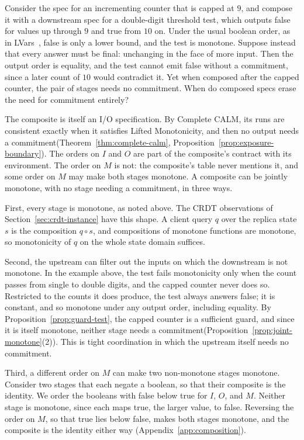 \documentclass[sigconf]{cidr-2027}
\theoremstyle{remark}
\newcommand{\commitment}{commitment\xspace}
\newcommand{\spectype}[1][]{I/O specification#1\xspace}
\begin{document}
Consider the spec for an incrementing counter that is capped at $9$, and
compose it with a downstream spec for a double-digit threshold test, which
outputs \textsf{false} for values up through $9$ and \textsf{true} from $10$ on. Under the usual boolean order, as in LVars~\cite{kuper2013lvars}, \textsf{false}
is only a lower bound, and the test is monotone. Suppose instead that every
answer must be final: unchanging in the face of more input. Then the output order is equality, and the test cannot
emit \textsf{false} without a \commitment, since a later count of $10$ would
contradict it. Yet when composed after the capped counter, the pair of
stages needs no \commitment. When do composed specs erase the need for
\commitment entirely?

The composite is itself an \spectype. By Complete CALM, its runs are
consistent exactly when it satisfies Lifted Monotonicity, and then no output needs a
\commitment (Theorem~\ref{thm:complete-calm},
Proposition~\ref{prop:exposure-boundary}). The orders on $I$ and $O$ are part
of the composite's contract with its environment. The order on $M$ is not:
the composite's table never mentions it, and some order on $M$ may make both
stages monotone. A composite can be jointly monotone, with no stage needing a
\commitment, in three ways.

First, every stage is monotone, as noted above. The CRDT observations of Section~\ref{sec:crdt-instance} have this shape. A
client query $q$ over the replica state $s$ is the composition $q\circ s$, and
compositions of monotone functions are monotone, so monotonicity of $q$ on the
whole state domain suffices.

Second, the upstream can filter out the inputs on which the downstream is not
monotone. In the example above, the test fails monotonicity only when the
count passes from single to double digits, and the capped counter never does
so. Restricted to the counts it does produce, the test always answers
\textsf{false}; it is constant, and so monotone under any output order,
including equality. By Proposition~\ref{prop:guard-test}, the capped counter
is a sufficient guard, and since it is itself monotone, neither stage needs
a \commitment (Proposition~\ref{prop:joint-monotone}(2)). This is tight
coordination in which the upstream itself needs no \commitment.

Third, a different order on $M$ can make two non-monotone stages monotone. Consider two stages that each negate a boolean, so that their composite is the
identity. We order the booleans with false below true for $I$, $O$, and $M$. Neither stage is monotone, since each maps true, the larger value, to false. Reversing the order on $M$, so that true lies below false, makes both stages
monotone, and the composite is the identity either way
(Appendix~\ref{app:composition}).
\end{document}

